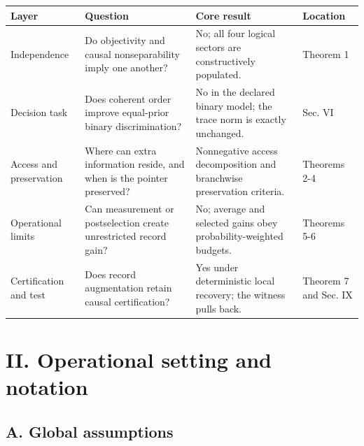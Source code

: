 \documentclass[
]{article}
\begin{document}
\begin{longtable}[]{@{}
  >{\raggedright\arraybackslash}p{}
  >{\raggedright\arraybackslash}p{}
  >{\raggedright\arraybackslash}p{}
  >{\raggedright\arraybackslash}p{}@{}}
\toprule\noalign{}
\begin{minipage}[b]{\linewidth}\raggedright
\textbf{Layer}
\end{minipage} & \begin{minipage}[b]{\linewidth}\raggedright
\textbf{Question}
\end{minipage} & \begin{minipage}[b]{\linewidth}\raggedright
\textbf{Core result}
\end{minipage} & \begin{minipage}[b]{\linewidth}\raggedright
\textbf{Location}
\end{minipage} \\
\midrule\noalign{}
\endhead
\bottomrule\noalign{}
\endlastfoot
Independence & Do objectivity and causal nonseparability imply one
another? & No; all four logical sectors are constructively populated. &
Theorem 1 \\
Decision task & Does coherent order improve equal-prior binary
discrimination? & No in the declared binary model; the trace norm is
exactly unchanged. & Sec. VI \\
Access and preservation & Where can extra information reside, and when
is the pointer preserved? & Nonnegative access decomposition and
branchwise preservation criteria. & Theorems 2-4 \\
Operational limits & Can measurement or postselection create
unrestricted record gain? & No; average and selected gains obey
probability-weighted budgets. & Theorems 5-6 \\
Certification and test & Does record augmentation retain causal
certification? & Yes under deterministic local recovery; the witness
pulls back. & Theorem 7 and Sec. IX \\
\end{longtable}

\section{II. Operational setting and
notation}\label{ii.-operational-setting-and-notation}

\subsection{A. Global assumptions}\label{a.-global-assumptions}
\end{document}
